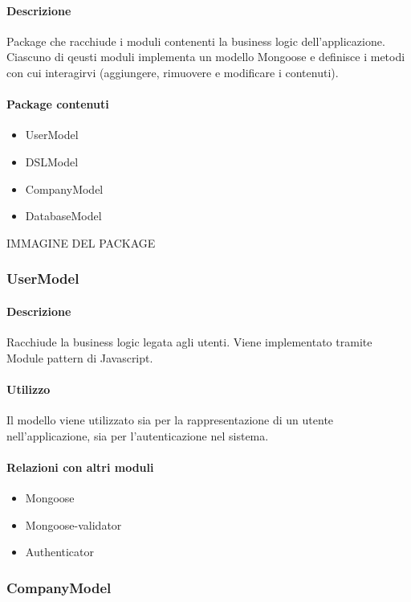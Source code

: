 \paragraph*{Descrizione}
Package che racchiude i moduli contenenti la business logic dell'applicazione. Ciascuno di qeusti moduli implementa un modello Mongoose e definisce i metodi con cui interagirvi (aggiungere, rimuovere e modificare i contenuti).

\paragraph*{Package contenuti}
\begin{itemize}
\item UserModel
\item DSLModel
\item CompanyModel
\item DatabaseModel
\end{itemize}

IMMAGINE DEL PACKAGE

\subsubsection{UserModel}
\paragraph*{Descrizione}

Racchiude la business logic legata agli utenti. Viene implementato tramite Module pattern di Javascript. 

\paragraph*{Utilizzo}
Il modello viene utilizzato sia per la rappresentazione di un utente nell'applicazione, sia per l'autenticazione nel sistema.

\paragraph*{Relazioni con altri moduli}
\begin{itemize}
\item Mongoose
\item Mongoose-validator
\item Authenticator
\end{itemize}

\subsubsection{CompanyModel}
